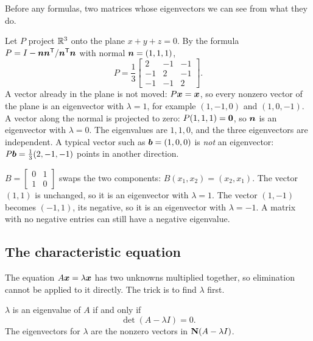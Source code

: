 Before any formulas, two matrices whose eigenvectors we can see from what they do.

\begin{example}\label{ex:u23-projection}
Let $P$ project $\mathbb{R}^{3}$ onto the plane $x+y+z=0$. By the formula
$P=I-\boldsymbol{n}\boldsymbol{n}^{\mathsf{T}}/\boldsymbol{n}^{\mathsf{T}}\boldsymbol{n}$ with normal $\boldsymbol{n}=(1,1,1)$,
\[
  P=\frac13\begin{bmatrix} 2&-1&-1\\ -1&2&-1\\ -1&-1&2\end{bmatrix}.
\]
A vector already in the plane is not moved: $P\boldsymbol{x}=\boldsymbol{x}$, so every nonzero vector of the
plane is an eigenvector with $\lambda=1$, for example $(1,-1,0)$ and $(1,0,-1)$. A vector
along the normal is projected to zero: $P(1,1,1)=\boldsymbol{0}$, so $\boldsymbol{n}$ is an eigenvector with
$\lambda=0$. The eigenvalues are $1,1,0$, and the three eigenvectors are independent. A
typical vector such as $\boldsymbol{b}=(1,0,0)$ is \emph{not} an eigenvector:
$P\boldsymbol{b}=\tfrac13(2,-1,-1)$ points in another direction.
\end{example}

\begin{example}\label{ex:u23-permutation}
$B=\begin{bmatrix} 0&1\\ 1&0\end{bmatrix}$ swaps the two components:
$B(x_1,x_2)=(x_2,x_1)$. The vector $(1,1)$ is unchanged, so it is an eigenvector with
$\lambda=1$. The vector $(1,-1)$ becomes $(-1,1)$, its negative, so it is an eigenvector
with $\lambda=-1$. A matrix with no negative entries can still have a negative eigenvalue.
\end{example}

\subsection{The characteristic equation}

The equation $A\boldsymbol{x}=\lambda\boldsymbol{x}$ has two unknowns multiplied together, so elimination
cannot be applied to it directly. The trick is to find $\lambda$ first.

\begin{theorem}\label{thm:u23-chareq}
$\lambda$ is an eigenvalue of $A$ if and only if
\[
  \det(A-\lambda I)=0 .
\]
The eigenvectors for $\lambda$ are the nonzero vectors in $\mathbf{N}(A-\lambda I)$.
\end{theorem}

